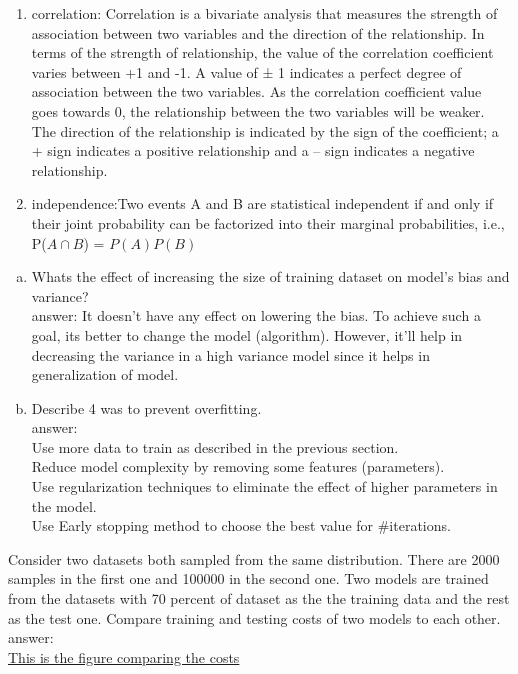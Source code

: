\documentclass[11pt,letterpaper]{article}
\begin{document}
\begin{exercise}
\begin{enumerate}[(1)]
	\item correlation: Correlation is a bivariate analysis that measures the strength of association between two variables and the direction of the relationship.  In terms of the strength of relationship, the value of the correlation coefficient varies between +1 and -1.  A value of ± 1 indicates a perfect degree of association between the two variables.  As the correlation coefficient value goes towards 0, the relationship between the two variables will be weaker.  The direction of the relationship is indicated by the sign of the coefficient; a + sign indicates a positive relationship and a – sign indicates a negative relationship.
	\item independence:Two events A and B are statistical independent if and only if their joint probability can be factorized into their marginal probabilities, i.e., P($A \cap B$) = $P(A)P(B)$
	\end{enumerate}
\end{exercise}

\begin{exercise}
    \begin{enumerate}[(a)]
        \item Whats the effect of increasing the size of training dataset on model's bias and variance? \\
        answer: It doesn't have any effect on lowering the bias. To achieve such a goal, its better to change the model (algorithm). However, it'll help in decreasing the variance in a high variance model since it helps in generalization of model.
        \item Describe 4 was to prevent overfitting.
        \\ answer:
        \\ Use more data to train as described in the previous section.
        \\ Reduce model complexity by removing some features (parameters).
        \\ Use regularization techniques to eliminate the effect of higher parameters in the model.
        \\ Use Early stopping method to choose the best value for \#iterations.
    \end{enumerate}
\end{exercise}

\begin{exercise}
    Consider two datasets both sampled from the same distribution. There are 2000 samples in the first one and 100000 in the second one. Two models are trained from the datasets with 70 percent of dataset as the the training data and the rest as the test one. Compare training and testing costs of two models to each other.
    \\ answer: 
    \\ \color{blue}\href{https://github.com/amirphl/AUT-machine-learning-HW1/raw/main/q3.png}{This is the figure comparing the costs}
\end{exercise}
\end{document}
